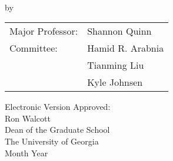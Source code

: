 \documentclass[12pt, notitlepage, twoside]{report}
\begin{document}

\newcommand{\degreesearned}{%
  M.S., Iran University of Science and Technology (IUST), Iran, 2016 \\
}%

\newcommand{\degreetype}{Dissertation}
\newcommand{\degreetitle}{Doctor of Philosophy}
\newcommand{\degreename}{in Computer Science}
\newcommand{\degreeyear}{2025}
\maketitlepage





\newpage
\thispagestyle{empty}
\vspace*{18pt}
\begin{center}
  \textsc{\doctitle}\\[18pt]
  by\\[18pt]
  \textsc{\docauthor}
\end{center}
\vfill

\begin{flushright}
  \begin{tabular}{ll}
    Major Professor: & Shannon Quinn    \\ [8pt]
    Committee:       & Hamid R. Arabnia \\
                     & Tianming Liu     \\
                     & Kyle Johnsen     \\
  \end{tabular}
\end{flushright}

\vspace*{3cm}

\begin{flushleft}
  Electronic Version Approved:\\[12pt]
  Ron Walcott\\
  Dean of the Graduate School\\
  The University of Georgia\\
  Month Year
\end{flushleft}
\vspace*{1.5cm}


\end{document}
